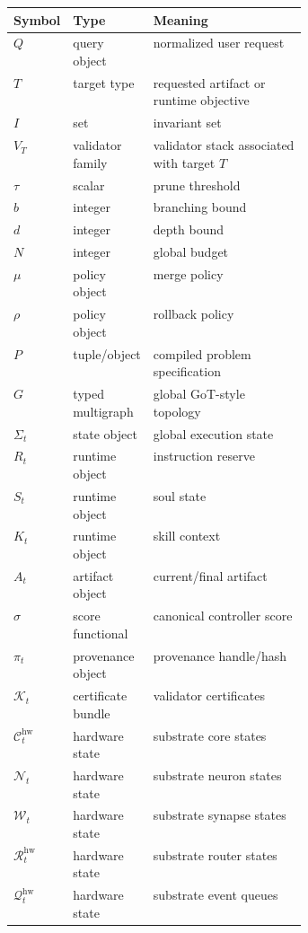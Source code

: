 \documentclass[11pt]{article}
\theoremstyle{remark}
\begin{document}
\begin{center}
\small
\begin{tabularx}{\linewidth}{@{}p{0.18\linewidth}p{0.20\linewidth}X@{}}
\toprule
\textbf{Symbol} & \textbf{Type} & \textbf{Meaning} \\
\midrule
\(Q\) & query object & normalized user request \\
\(T\) & target type & requested artifact or runtime objective \\
\(I\) & set & invariant set \\
\(V_T\) & validator family & validator stack associated with target \(T\) \\
\(\tau\) & scalar & prune threshold \\
\(b\) & integer & branching bound \\
\(d\) & integer & depth bound \\
\(N\) & integer & global budget \\
\(\mu\) & policy object & merge policy \\
\(\rho\) & policy object & rollback policy \\
\(P\) & tuple/object & compiled problem specification \\
\(G\) & typed multigraph & global GoT-style topology \\
\(\Sigma_t\) & state object & global execution state \\
\(R_t\) & runtime object & instruction reserve \\
\(S_t\) & runtime object & soul state \\
\(K_t\) & runtime object & skill context \\
\(A_t\) & artifact object & current/final artifact \\
\(\sigma\) & score functional & canonical controller score \\
\(\pi_t\) & provenance object & provenance handle/hash \\
\(\mathcal{K}_t\) & certificate bundle & validator certificates \\
\(\mathcal{C}^{\mathrm{hw}}_t\) & hardware state & substrate core states \\
\(\mathcal{N}_t\) & hardware state & substrate neuron states \\
\(\mathcal{W}_t\) & hardware state & substrate synapse states \\
\(\mathcal{R}^{\mathrm{hw}}_t\) & hardware state & substrate router states \\
\(\mathcal{Q}^{\mathrm{hw}}_t\) & hardware state & substrate event queues \\

\end{tabularx}
\end{center}
\end{document}
